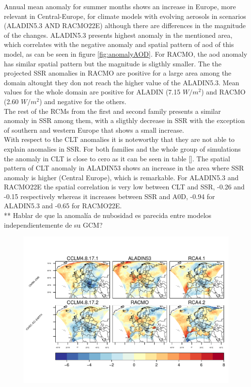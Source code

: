 Annual mean anomaly for summer months shows an increase in Europe, more relevant in Central-Europe, for climate models with evolving aerosols in scenarios (ALADIN5.3 AND RACMO22E) although there are differences in the magnitude of the changes. ALADIN5.3 presents highest anomaly in the mentioned area, which correlates with the negative anomaly and spatial pattern of aod of this model, as can be seen in figure \ref{fig:anomalyAOD}. For RACMO, the aod anomaly has similar spatial pattern but the magnitude is sligthly smaller. The the projected SSR anomalies in RACMO are positive for a large area among the domain altought they don not reach the higher value of the ALADIN5.3. Mean values for the whole domain are positive for ALADIN (7.15 $W/m^2$) and RACMO (2.60 $W/m^2$) and negative for the others.\\

The rest of the RCMs from the first and second family presents a similar anomaly in SSR among them, with a sligthly decrease in SSR with the exception of southern and western Europe that shows a small increase.\\

With respect to the CLT anomalies it is noteworthy that they are not able to explain anomalies in SSR. For both families and the whole group of simulations the anomaly in CLT is close to cero as it can be seen in table \ref{}. The spatial pattern of CLT anomaly in ALADIN53 shows an increase in the area where SSR anomaly is higher (Central Europe), which is remarkable. For ALADIN5.3 and RACMO22E the spatial correlation is very low between CLT and SSR, -0.26 and -0.15 respectively whereas it increases between SSR and A0D, -0.94 for ALADIN5.3 and -0.65 for RACMO22E.\\

** Hablar de que la anomalía de nubosidad es parecida entre modelos independientemente de su GCM?

\begin{figure}[h!]
\centering\includegraphics[width=1\textwidth]{figs/capitulo7/ANOMALIAS_JJA_CLT_2050-2021_r12.pdf}
\caption{}
\label{fig:anomalyCLT}
\end{figure}

